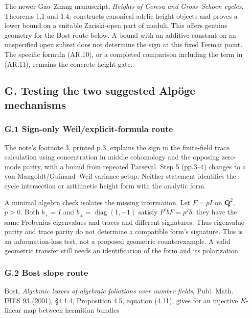\documentclass[11pt,a4paper]{article}
\begin{document}
The newer Gao--Zhang manuscript, \emph{Heights of Ceresa and
Gross--Schoen cycles}, Theorems 1.1 and 1.4, constructs canonical adelic
height objects and proves a lower bound on a suitable Zariski-open part
of moduli. This offers genuine geometry for the Bost route below. A
bound with an additive constant on an unspecified open subset does not
determine the sign at this fixed Fermat point. The specific formula
(AR.10), or a completed comparison including the term in (AR.11),
remains the concrete height gate.

\subsection{G. Testing the two suggested Alpöge
mechanisms}\label{g.-testing-the-two-suggested-alpuxf6ge-mechanisms}

\subsubsection{G.1 Sign-only Weil/explicit-formula
route}\label{g.1-sign-only-weilexplicit-formula-route}

The note's footnote 3, printed p.3, explains the sign in the
finite-field trace calculation using concentration in middle cohomology
and the opposing zero-mode parity, with a bound from repeated Parseval.
Step 5 (pp.3--4) changes to a von Mangoldt/Guinand--Weil variance setup.
Neither statement identifies the cycle intersection or arithmetic height
form with the analytic form.

A minimal algebra check isolates the missing information. Let \(F=pI\)
on \(\mathbf Q^2\), \(p>0\). Both \(b_+=I\) and
\(b_\pm=\operatorname{diag}(1,-1)\) satisfy \(F^tbF=p^2b\); they have
the same Frobenius eigenvalues and traces and different signatures. Thus
eigenvalue purity and trace parity do not determine a compatible form's
signature. This is an information-loss test, not a proposed geometric
counterexample. A valid geometric transfer still needs an identification
of the form and its polarization.

\subsubsection{G.2 Bost slope route}\label{g.2-bost-slope-route}

Bost, \emph{Algebraic leaves of algebraic foliations over number
fields}, Publ. Math. IHES 93 (2001), §4.1.4, Proposition 4.5, equation
(4.11), gives for an injective \(K\)-linear map between hermitian
bundles
\end{document}

